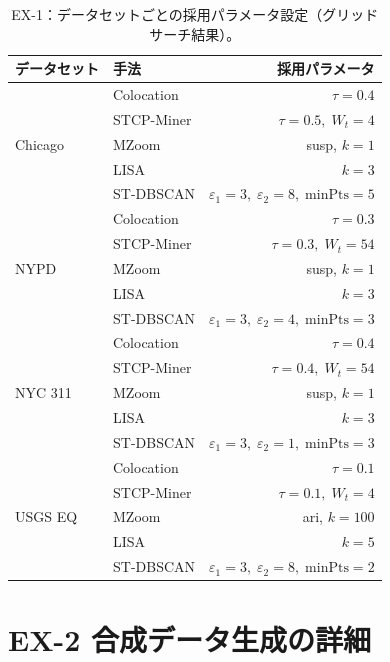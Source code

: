 \begin{table}[h]
\centering
\caption{EX-1：データセットごとの採用パラメータ設定（グリッドサーチ結果）。}
\label{tab:best_params_f1}
\small
\begin{tabular}{llr}
\toprule
データセット & 手法 & 採用パラメータ \\
\midrule
\multirow{5}{*}{Chicago}
  & Colocation  & $\tau{=}0.4$ \\
  & STCP-Miner  & $\tau{=}0.5,\; W_t{=}4$ \\
  & MZoom      & susp, $k{=}1$ \\
  & LISA       & $k{=}3$ \\
  & ST-DBSCAN  & $\varepsilon_1{=}3,\;\varepsilon_2{=}8,\;\mathrm{minPts}{=}5$ \\
\midrule
\multirow{5}{*}{NYPD}
  & Colocation  & $\tau{=}0.3$ \\
  & STCP-Miner  & $\tau{=}0.3,\; W_t{=}54$ \\
  & MZoom      & susp, $k{=}1$ \\
  & LISA       & $k{=}3$ \\
  & ST-DBSCAN  & $\varepsilon_1{=}3,\;\varepsilon_2{=}4,\;\mathrm{minPts}{=}3$ \\
\midrule
\multirow{5}{*}{NYC 311}
  & Colocation  & $\tau{=}0.4$ \\
  & STCP-Miner  & $\tau{=}0.4,\; W_t{=}54$ \\
  & MZoom      & susp, $k{=}1$ \\
  & LISA       & $k{=}3$ \\
  & ST-DBSCAN  & $\varepsilon_1{=}3,\;\varepsilon_2{=}1,\;\mathrm{minPts}{=}3$ \\
\midrule
\multirow{5}{*}{USGS EQ}
  & Colocation  & $\tau{=}0.1$ \\
  & STCP-Miner  & $\tau{=}0.1,\; W_t{=}4$ \\
  & MZoom      & ari, $k{=}100$ \\
  & LISA       & $k{=}5$ \\
  & ST-DBSCAN  & $\varepsilon_1{=}3,\;\varepsilon_2{=}8,\;\mathrm{minPts}{=}2$ \\
\bottomrule
\end{tabular}
\end{table}

\section{EX-2 合成データ生成の詳細}
\label{sec:ex2_data_details}

